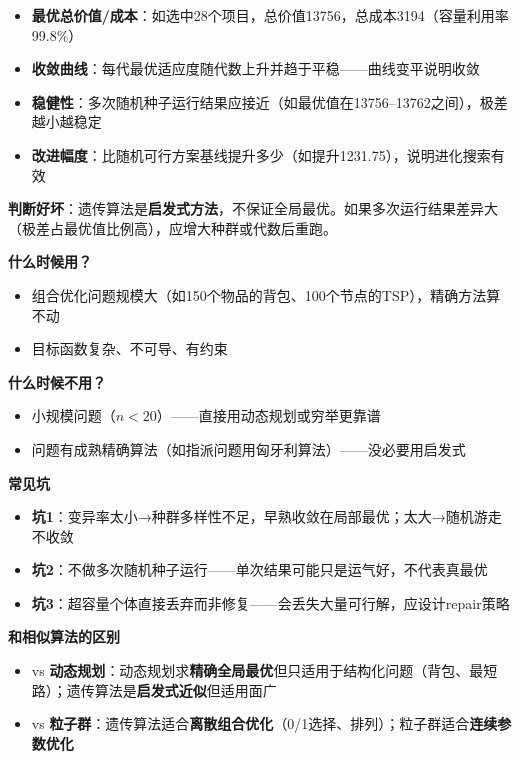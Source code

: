 \begin{algoresult}
\begin{itemize}
    \item \textbf{最优总价值/成本}：如选中28个项目，总价值13756，总成本3194（容量利用率99.8\%）
    \item \textbf{收敛曲线}：每代最优适应度随代数上升并趋于平稳——曲线变平说明收敛
    \item \textbf{稳健性}：多次随机种子运行结果应接近（如最优值在13756--13762之间），极差越小越稳定
    \item \textbf{改进幅度}：比随机可行方案基线提升多少（如提升1231.75），说明进化搜索有效
\end{itemize}

\textbf{判断好坏}：遗传算法是\textbf{启发式方法}，不保证全局最优。如果多次运行结果差异大（极差占最优值比例高），应增大种群或代数后重跑。
\end{algoresult}

\begin{algonotes}
\textbf{什么时候用？}
\begin{itemize}
    \item 组合优化问题规模大（如150个物品的背包、100个节点的TSP），精确方法算不动
    \item 目标函数复杂、不可导、有约束
\end{itemize}

\textbf{什么时候不用？}
\begin{itemize}
    \item 小规模问题（$n<20$）——直接用动态规划或穷举更靠谱
    \item 问题有成熟精确算法（如指派问题用匈牙利算法）——没必要用启发式
\end{itemize}

\textbf{常见坑}
\begin{itemize}
    \item \textbf{坑1}：变异率太小→种群多样性不足，早熟收敛在局部最优；太大→随机游走不收敛
    \item \textbf{坑2}：不做多次随机种子运行——单次结果可能只是运气好，不代表真最优
    \item \textbf{坑3}：超容量个体直接丢弃而非修复——会丢失大量可行解，应设计repair策略
\end{itemize}

\textbf{和相似算法的区别}
\begin{itemize}
    \item vs \textbf{动态规划}：动态规划求\textbf{精确全局最优}但只适用于结构化问题（背包、最短路）；遗传算法是\textbf{启发式近似}但适用面广
    \item vs \textbf{粒子群}：遗传算法适合\textbf{离散组合优化}（0/1选择、排列）；粒子群适合\textbf{连续参数优化}
\end{itemize}
\end{algonotes}

